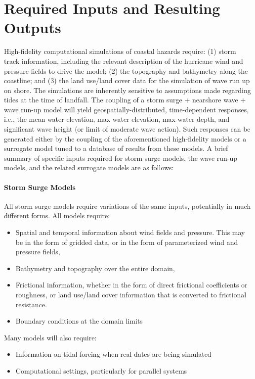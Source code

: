 \section{Required Inputs and Resulting Outputs}
\label{sec:storm_surge_io}

High-fidelity computational simulations of coastal hazards require: (1) storm track information, including the relevant description of the hurricane wind and pressure fields to drive the model; (2) the topography and bathymetry along the coastline; and (3) the land use/land cover data for the simulation of wave run up on shore. The simulations are inherently sensitive to assumptions made regarding tides at the time of landfall. The coupling of a storm surge + nearshore wave + wave run-up model will yield geospatially-distributed, time-dependent responses, i.e., the mean water elevation, max water elevation, max water depth, and significant wave height (or limit of moderate wave action). Such responses can be generated either by the coupling of the aforementioned high-fidelity models or a surrogate model tuned to a database of results from these models. A brief summary of specific inputs required for storm surge models, the wave run-up models, and the related surrogate models are as follows:

\paragraph{Storm Surge Models} All storm surge models require variations of the same inputs, potentially in much different forms. All models require:

\begin{itemize}
    \item Spatial and temporal information about wind fields and pressure. This may be in the form of gridded data, or in the form of parameterized wind and pressure fields,
    \item Bathymetry and topography over the entire domain,
    \item Frictional information, whether in the form of direct frictional coefficients or roughness, or land use/land cover information that is converted to frictional resistance. 
    \item Boundary conditions at the domain limits
\end{itemize}

\noindent
Many models will also require:

\begin{itemize}
    \item Information on tidal forcing when real dates are being simulated
    \item Computational settings, particularly for parallel systems
\end{itemize}

